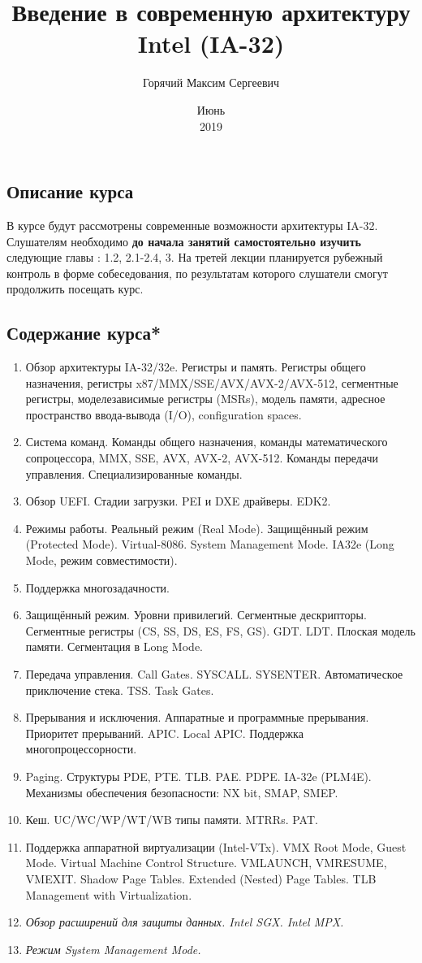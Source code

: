 \documentclass[english,russian,12pt]{article}
\title{Введение в современную архитектуру Intel (IA-32)}
\date{Июнь\\ 2019}
\author{Горячий Максим Сергеевич}
\begin{document}
\maketitle

\subsection*{Описание курса}
В курсе будут рассмотрены современные возможности архитектуры IA-32. Слушателям необходимо {\bf до начала занятий самостоятельно изучить} следующие главы \cite{Zubkov}: 1.2, 2.1-2.4, 3.
На третей лекции планируется рубежный контроль в форме собеседования, по результатам которого слушатели смогут продолжить посещать курс. 


\subsection*{Содержание курса*}
\begin{enumerate}
  \item Обзор архитектуры IA-32/32e. Регистры и память. Регистры общего назначения, регистры x87/MMX/SSE/AVX/AVX-2/AVX-512, сегментные регистры, моделезависимые регистры (MSRs), модель памяти, адресное пространство ввода-вывода (I/O), configuration spaces.
  \item Система команд. Команды общего назначения, команды математического сопроцессора, MMX, SSE, AVX, AVX-2, AVX-512. Команды передачи управления. Специализированные команды.
  \item Обзор UEFI. Стадии загрузки. PEI и DXE драйверы. EDK2.
  \item Режимы работы. Реальный режим (Real Mode). Защищённый режим (Protected Mode).  Virtual-8086. System Management Mode. IA32e (Long Mode, режим совместимости).
  \item Поддержка многозадачности.
  \item Защищённый режим. Уровни привилегий. Сегментные дескрипторы. Сегментные регистры (CS, SS, DS, ES, FS, GS). GDT. LDT. Плоская модель памяти. Сегментация в Long Mode.
  \item Передача управления. Call Gates. SYSCALL. SYSENTER. Автоматическое приключение стека. TSS. Task Gates.
  \item Прерывания и исключения. Аппаратные и программные прерывания. Приоритет прерываний. APIC. Local APIC. Поддержка многопроцессорности.
  \item Paging. Структуры PDE, PTE. TLB. PAE. PDPE. IA-32e (PLM4E). Механизмы обеспечения безопасности: NX bit, SMAP, SMEP.
  \item Кеш. UC/WC/WP/WT/WB типы памяти. MTRRs. PAT.
  \item Поддержка аппаратной виртуализации (Intel-VTx). VMX Root Mode, Guest Mode. Virtual Machine Control Structure. VMLAUNCH, VMRESUME, VMEXIT. Shadow Page Tables. Extended (Nested) Page Tables. TLB Management with Virtualization.
  \item {\it Обзор расширений для защиты данных. Intel SGX. Intel MPX.}
  \item {\it Режим System Management Mode.}
\end{enumerate}
\end{document}

